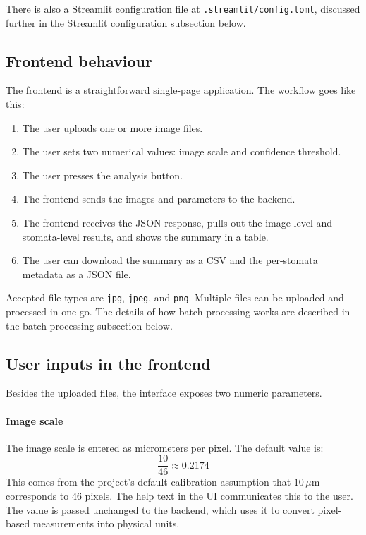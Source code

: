 \documentclass{article}
\begin{document}
There is also a Streamlit configuration file at \texttt{.streamlit/config.toml}, discussed further in the Streamlit configuration subsection below.

\subsection{Frontend behaviour}

The frontend is a straightforward single-page application. The workflow goes like this:

\begin{enumerate}
    \item The user uploads one or more image files.
    \item The user sets two numerical values: image scale and confidence threshold.
    \item The user presses the analysis button.
    \item The frontend sends the images and parameters to the backend.
    \item The frontend receives the JSON response, pulls out the image-level and stomata-level results, and shows the summary in a table.
    \item The user can download the summary as a CSV and the per-stomata metadata as a JSON file.
\end{enumerate}

Accepted file types are \texttt{jpg}, \texttt{jpeg}, and \texttt{png}. Multiple files can be uploaded and processed in one go. The details of how batch processing works are described in the batch processing subsection below.

\subsection{User inputs in the frontend}

Besides the uploaded files, the interface exposes two numeric parameters.

\paragraph{Image scale}
The image scale is entered as micrometers per pixel. The default value is:
\[
\frac{10}{46} \approx 0.2174
\]
This comes from the project's default calibration assumption that $10\,\mu\text{m}$ corresponds to 46 pixels. The help text in the UI communicates this to the user. The value is passed unchanged to the backend, which uses it to convert pixel-based measurements into physical units.
\end{document}
